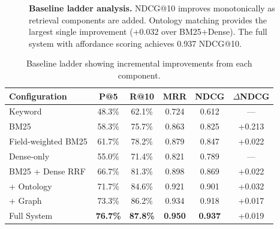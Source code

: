 \documentclass{article}
\theoremstyle{definition}
\begin{document}
\begin{figure}[t]
\centering
{}
\caption{\textbf{Baseline ladder analysis.} NDCG@10 improves monotonically as retrieval components are added. Ontology matching provides the largest single improvement (+0.032 over BM25+Dense). The full system with affordance scoring achieves 0.937 NDCG@10.}
\label{fig:ladder}
\end{figure}

\begin{table}[t]
\centering
\caption{Baseline ladder showing incremental improvements from each component.}
\label{tab:ladder}
\begin{tabular}{lccccc}
\toprule
\textbf{Configuration} & \textbf{P@5} & \textbf{R@10} & \textbf{MRR} & \textbf{NDCG} & \textbf{$\Delta$NDCG} \\
\midrule
Keyword & 48.3\% & 62.1\% & 0.724 & 0.612 & --- \\
BM25 & 58.3\% & 75.7\% & 0.863 & 0.825 & +0.213 \\
Field-weighted BM25 & 61.7\% & 78.2\% & 0.879 & 0.847 & +0.022 \\
Dense-only & 55.0\% & 71.4\% & 0.821 & 0.789 & --- \\
BM25 + Dense RRF & 66.7\% & 81.3\% & 0.898 & 0.869 & +0.022 \\
+ Ontology & 71.7\% & 84.6\% & 0.921 & 0.901 & +0.032 \\
+ Graph & 73.3\% & 86.2\% & 0.934 & 0.918 & +0.017 \\
Full System & \textbf{76.7\%} & \textbf{87.8\%} & \textbf{0.950} & \textbf{0.937} & +0.019 \\
\bottomrule
\end{tabular}
\end{table}
\end{document}
